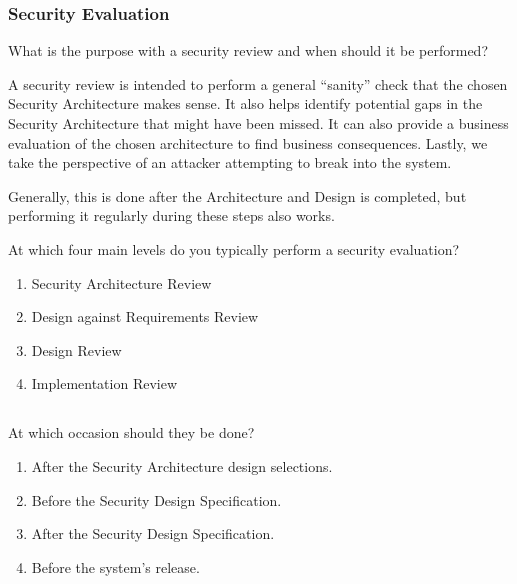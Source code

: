 \section{Security Evaluation}\label{sec:Security_Evaluation}
\begin{questions}
\question{} What is the purpose with a security review and when should it be performed?
  \begin{solution}
    A security review is intended to perform a general ``sanity'' check that the chosen Security Architecture makes sense.
    It also helps identify potential gaps in the Security Architecture that might have been missed.
    It can also provide a business evaluation of the chosen architecture to find business consequences.
    Lastly, we take the perspective of an attacker attempting to break into the system.

    Generally, this is done after the Architecture and Design is completed, but performing it regularly during these steps also works.
  \end{solution}

\question{} At which four main levels do you typically perform a security evaluation?
  \begin{solution}
    \begin{enumerate}[noitemsep]
    \item Security Architecture Review
    \item Design against Requirements Review
    \item Design Review
    \item Implementation Review
    \end{enumerate}
  \end{solution}

  \begin{parts}
  \part{} At which occasion should they be done?
    \begin{solution}
      \begin{enumerate}[noitemsep]
      \item After the Security Architecture design selections.
      \item Before the Security Design Specification.
      \item After the Security Design Specification.
      \item Before the system's release.
      \end{enumerate}
    \end{solution}
  \end{parts}


\end{questions}
